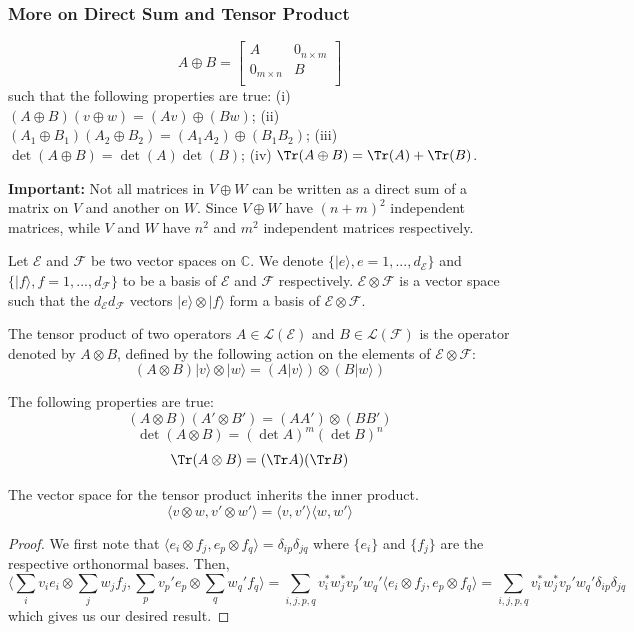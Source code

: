 \documentclass[a4paper]{article}
\begin{document}
\subsubsection*{More on Direct Sum and Tensor Product}
\begin{defi}
$$A\oplus B=\begin{bmatrix}A&0_{n\times m}\\0_{m\times n}&B\\\end{bmatrix}$$
such that the following properties are true: (i) $(A\oplus B)(v\oplus w)=(Av)\oplus(Bw)$; (ii) $(A_1\oplus B_1)(A_2\oplus B_2)=(A_1A_2)\oplus(B_1B_2)$; (iii) $\det(A\oplus B)=\det(A)\det(B)$; (iv) $\Tr(A\oplus B)=\Tr(A)+\Tr(B)$. 
\end{defi}
\textbf{Important:} Not all matrices in $V\oplus W$ can be written as a direct sum of a matrix on $V$ and another on $W$. Since $V\oplus W$ have $(n+m)^2$ independent matrices, while $V$ and $W$ have $n^2$ and $m^2$ independent matrices respectively.
\begin{defi}
Let $\mathcal{E}$ and $\mathcal{F}$ be two vector spaces on $\mathbb{C}$. We denote $\{|e\rangle,e=1,...,d_{\mathcal{E}}\}$ and $\{|f\rangle,f=1,...,d_{\mathcal{F}}\}$ to be a basis of $\mathcal{E}$ and $\mathcal{F}$ respectively.  $\mathcal{E}\otimes\mathcal{F}$ is a vector space such that the $d_{\mathcal{E}}d_{\mathcal{F}}$ vectors $|e\rangle\otimes|f\rangle$ form a basis of $\mathcal{E}\otimes\mathcal{F}$.
\end{defi}
\begin{defi}
The tensor product of two operators $A\in\mathcal{L}(\mathcal{E})$ and $B\in\mathcal{L}(\mathcal{F})$ is the operator denoted by $A\otimes B$, defined by the following action on the elements of $\mathcal{E}\otimes\mathcal{F}$:
$$(A\otimes B)|v\rangle\otimes|w\rangle=(A|v\rangle)\otimes(B|w\rangle)$$
\end{defi}
\begin{thm}
The following properties are true:
$$(A\otimes B)(A'\otimes B')=(AA')\otimes(BB')$$
$$\det(A\otimes B)=(\det A)^m(\det B)^n$$
$$\Tr(A\otimes B)=(\Tr A)(\Tr B)$$
\end{thm}
\begin{thm}
The vector space for the tensor product inherits the inner product.
$$\langle v\otimes w,v'\otimes w'\rangle=\langle v,v'\rangle\langle w,w'\rangle$$
\end{thm}
\begin{proof}
We first note that $\langle e_i\otimes f_j,e_p\otimes f_q\rangle=\delta_{ip}\delta_{jq}$ where $\{e_i\}$ and $\{f_j\}$ are the respective orthonormal bases. Then,
$$\bigg\langle\sum_iv_ie_i\otimes\sum_jw_jf_j,\sum_pv_p'e_p\otimes\sum_qw_q'f_q\bigg\rangle=\sum_{i,j,p,q}v_i^*w_j^*v_p'w_q'\langle e_i\otimes f_j,e_p\otimes f_q\rangle=\sum_{i,j,p,q}v_i^*w_j^*v_p'w_q'\delta_{ip}\delta_{jq}$$
which gives us our desired result.
\end{proof}
\newpage
\end{document}
